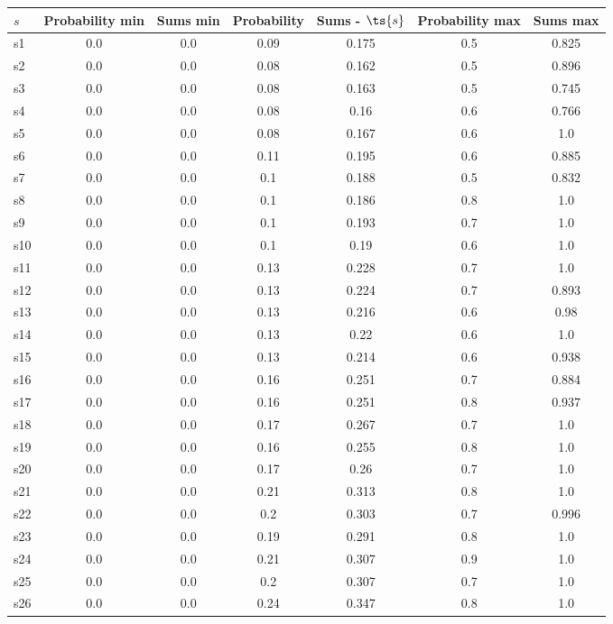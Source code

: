 \documentclass{article}
\begin{document}
\noindent\begin{tabular}{|l|c|c|c|c|c|c|}
\hline
$s$& Probability min & Sums min & Probability & Sums - $\ts{s}$ & Probability max & Sums max\\
\hline
s1 &0.0 & 0.0 & 0.09 & 0.175 & 0.5 & 0.825\\
\hline
s2 &0.0 & 0.0 & 0.08 & 0.162 & 0.5 & 0.896\\
\hline
s3 &0.0 & 0.0 & 0.08 & 0.163 & 0.5 & 0.745\\
\hline
s4 &0.0 & 0.0 & 0.08 & 0.16 & 0.6 & 0.766\\
\hline
s5 &0.0 & 0.0 & 0.08 & 0.167 & 0.6 & 1.0\\
\hline
s6 &0.0 & 0.0 & 0.11 & 0.195 & 0.6 & 0.885\\
\hline
s7 &0.0 & 0.0 & 0.1 & 0.188 & 0.5 & 0.832\\
\hline
s8 &0.0 & 0.0 & 0.1 & 0.186 & 0.8 & 1.0\\
\hline
s9 &0.0 & 0.0 & 0.1 & 0.193 & 0.7 & 1.0\\
\hline
s10 &0.0 & 0.0 & 0.1 & 0.19 & 0.6 & 1.0\\
\hline
s11 &0.0 & 0.0 & 0.13 & 0.228 & 0.7 & 1.0\\
\hline
s12 &0.0 & 0.0 & 0.13 & 0.224 & 0.7 & 0.893\\
\hline
s13 &0.0 & 0.0 & 0.13 & 0.216 & 0.6 & 0.98\\
\hline
s14 &0.0 & 0.0 & 0.13 & 0.22 & 0.6 & 1.0\\
\hline
s15 &0.0 & 0.0 & 0.13 & 0.214 & 0.6 & 0.938\\
\hline
s16 &0.0 & 0.0 & 0.16 & 0.251 & 0.7 & 0.884\\
\hline
s17 &0.0 & 0.0 & 0.16 & 0.251 & 0.8 & 0.937\\
\hline
s18 &0.0 & 0.0 & 0.17 & 0.267 & 0.7 & 1.0\\
\hline
s19 &0.0 & 0.0 & 0.16 & 0.255 & 0.8 & 1.0\\
\hline
s20 &0.0 & 0.0 & 0.17 & 0.26 & 0.7 & 1.0\\
\hline
s21 &0.0 & 0.0 & 0.21 & 0.313 & 0.8 & 1.0\\
\hline
s22 &0.0 & 0.0 & 0.2 & 0.303 & 0.7 & 0.996\\
\hline
s23 &0.0 & 0.0 & 0.19 & 0.291 & 0.8 & 1.0\\
\hline
s24 &0.0 & 0.0 & 0.21 & 0.307 & 0.9 & 1.0\\
\hline
s25 &0.0 & 0.0 & 0.2 & 0.307 & 0.7 & 1.0\\
\hline
s26 &0.0 & 0.0 & 0.24 & 0.347 & 0.8 & 1.0\\
\hline

\end{tabular}
\end{document}
